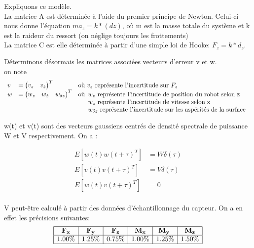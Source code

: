 \documentclass[12pt,twoside,a4paper]{article}
\begin{document}
Expliquons ce modèle. \\
La matrice A est déterminée à l'aide du premier principe de Newton. Celui-ci nous donne l'équation
$ ma_z = k*(dz) $, où m est la masse totale du système et k est la raideur du ressort (on néglige toujours les frottements)
\\
La matrice C est elle déterminée à partir d'une simple loi de Hooke: $F_z = k*d_z$. 

\vspace{2cm}

Déterminons désormais les  matrices associées vecteurs d'erreur v et w. \\
on note 
$$
\begin{array}{lll}
 v &= \begin{pmatrix} v_{z} & v_{\dot{z}}  \end{pmatrix} ^T  & \text{où $v_z$ représente l'incertitude sur $F_z$} \\
 w &= \begin{pmatrix} w_z & w_{\dot{z}} &  w_{\delta{z}} \end{pmatrix}^T & 
 		\text{où}
		\begin{array}[t]{l}
		\text{$w_z$ représente l'incertitude de position du robot selon z} \\
		\text{$w_{\dot{z}}$ représente l'incertitude de vitesse selon z} \\
		\text{$w_{\delta{z}}$ représente l'incertitude sur les aspérités de la surface} \\
		\end{array} \\

 \end{array}
 $$
 


w(t) et v(t) sont des vecteurs gaussiens centrés de densité spectrale de puissance W et V respectivement. On a :

$$
\begin{array}{ll}
E[w(t) w(t+\tau)^T ] &= W \delta(\tau) \\
E[v(t) v(t+\tau)^T ] &= V \delta(\tau)  \\
E[w(t) v(t+\tau)^T ] &= 0  \\
\end{array}
$$

\vspace{1cm}

V peut-être calculé à partir des données d'échantillonnage du capteur. On a en effet les précisions suivantes:
$$
\begin{array}{|c|c|c|c|c|c|}	
	\hline
	\bold{F_x} & \bold{F_y} & \bold{F_z} & \bold{M_x} & \bold{M_y} & \bold{M_z} \\
	\hline 
	1.00\% & 1.25\% & 0.75\% & 1.00\% & 1.25\% & 1.50\% \\
	\hline
\end{array}
$$
\end{document}
